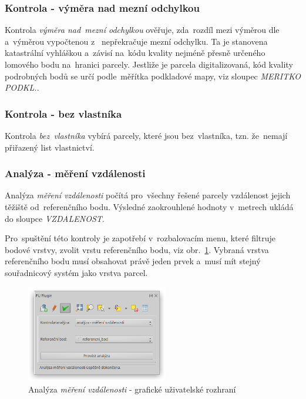 \subsubsection{Kontrola - výměra nad mezní odchylkou}
\label{manual_kontrola_vymera}

Kontrola \textit{výměra nad~mezní odchylkou} ověřuje, zda~rozdíl mezi výměrou dle~ a~výměrou vypočtenou z~ nepřekračuje mezní odchylku. Ta je stanovena katastrální vyhláškou a~závisí na~kódu kvality nejméně přesně určeného lomového bodu na~hranici parcely. Jestliže je parcela digitalizovaná, kód kvality podrobných bodů se určí podle~měřítka podkladové mapy, viz sloupec \textit{MERITKO PODKL.}.

\subsubsection{Kontrola - bez vlastníka}
\label{manual_kontrola_bez_vlastnika}

Kontrola \textit{bez~vlastníka} vybírá parcely, které jsou bez~vlastníka, tzn. že~nemají přiřazený list vlastnictví.

\subsubsection{Analýza - měření vzdálenosti}
\label{manual_analyza_vzdalenosti}

Analýza \textit{měření vzdálenosti} počítá pro~všechny řešené parcely vzdálenost jejich těžiště od~referenčního bodu. Výsledné zaokrouhlené hodnoty v~metrech ukládá do sloupce \textit{VZDALENOST}.

Pro~spuštění této kontroly je zapotřebí v~rozbalovacím menu, které filtruje bodové vrstvy, zvolit vrstu referenčního bodu, viz obr.~\ref{fig:manual_analyza_vzdalenosti_gui}. Vybraná vrstva referenčního bodu musí obsahovat právě jeden prvek a~musí mít stejný souřadnicový systém jako vrstva parcel.

	\begin{figure}[H]
		\centering
		\includegraphics[width=0.55\textwidth]{./pictures/analyza_vzdalenost.png}
		\caption[Analýza \textit{měření vzdálenosti} - grafické uživatelské rozhraní]{Analýza \textit{měření vzdálenosti} - grafické uživatelské rozhraní}
		\label{fig:manual_analyza_vzdalenosti_gui}
 	\end{figure}

